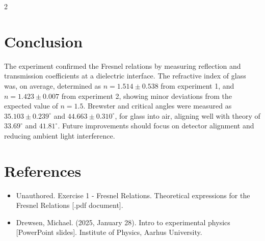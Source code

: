 \documentclass[a4paper,oneside,article]{memoir}
\begin{document}
\begin{multicols}{2}
\chapter{Conclusion}
The experiment confirmed the Fresnel relations by measuring reflection and transmission coefficients at a dielectric interface. The refractive index of glass was, on average, determined as $n = 1.514 \pm 0.538$ from experiment 1, and $n = 1.423 \pm 0.007$ from experiment 2, showing minor deviations from the expected value of $n = 1.5$. Brewster and critical angles were measured as $35.103 \pm 0.239^{\circ}$ and $44.663 \pm 0.310^{\circ}$, for glass into air, aligning well with theory of $33.69^{\circ}$ and $41.81^{\circ}$. Future improvements should focus on detector alignment and reducing ambient light interference.


\end{multicols}



\chapter{References}
\begin{itemize}
    \item Unauthored. Exercise 1 - Fresnel Relations. Theoretical expressions for the Fresnel Relations [.pdf document].
    \item Drewsen, Michael. (2025, January 28). Intro to experimental physics [PowerPoint slides]. Institute of Physics, Aarhus University.
\end{itemize}
\end{document}

